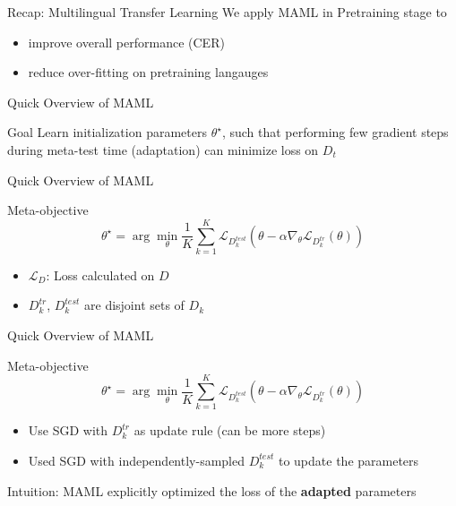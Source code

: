 \documentclass{beamer}
\begin{document}
\begin{frame}[t]{Recap: Multilingual Transfer Learning}
  We apply MAML in Pretraining stage to
  \begin{itemize}
    \item improve overall performance (CER)
    \item reduce over-fitting on pretraining langauges
  \end{itemize}
\end{frame}


\begin{frame}[t]{Quick Overview of MAML}
  \begin{block}{Goal}
    Learn initialization parameters $\theta^\star$, such that performing few gradient steps during meta-test time (adaptation) can minimize loss on $D_t$
  \end{block}

\end{frame}

\begin{frame}[t]{Quick Overview of MAML}
  \begin{block}{Meta-objective}
    \begin{equation*}
    \theta^\star = \arg \min_\theta \frac{1}{K}\sum_{k=1}^{K}\mathcal{L}_{D_k^{test}}(\theta - \alpha \nabla_\theta \mathcal{L}_{D_k^{tr}}(\theta))
    \end{equation*}
  \end{block}

  \begin{itemize}
    \item $\mathcal{L}_D$: Loss calculated on $D$
    \item $D_k^{tr}$, $D_k^{test}$ are disjoint sets of $D_k$
  \end{itemize}
\end{frame}

\begin{frame}[t]{Quick Overview of MAML}
  \begin{block}{Meta-objective}
    \begin{equation*}
    \theta^\star = \arg \min_\theta \frac{1}{K}\sum_{k=1}^{K}\mathcal{L}_{D_k^{test}}(\theta - \alpha \nabla_\theta \mathcal{L}_{D_k^{tr}}(\theta))
    \end{equation*}
  \end{block}

  \begin{itemize}
    \item Use SGD with $D_k^{tr}$ as update rule (can be more steps)
    \item Used SGD with independently-sampled $D_k^{test}$ to update the parameters
  \end{itemize}

  \vspace{1em}

  Intuition: MAML explicitly optimized the loss of the \textbf{adapted} parameters
\end{frame}
\end{document}
